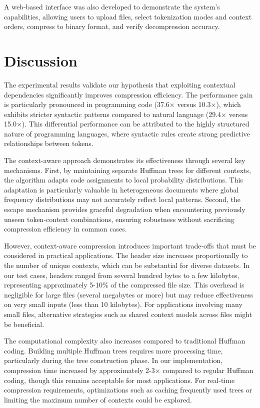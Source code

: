 \documentclass[conference]{IEEEtran}
\begin{document}
A web-based interface was also developed to demonstrate the system's capabilities, allowing users to upload files, select tokenization modes and context orders, compress to binary format, and verify decompression accuracy.

\section{Discussion}
The experimental results validate our hypothesis that exploiting contextual dependencies significantly improves compression efficiency. The performance gain is particularly pronounced in programming code (37.6× versus 10.3×), which exhibits stricter syntactic patterns compared to natural language (29.4× versus 15.0×). This differential performance can be attributed to the highly structured nature of programming languages, where syntactic rules create strong predictive relationships between tokens.

The context-aware approach demonstrates its effectiveness through several key mechanisms. First, by maintaining separate Huffman trees for different contexts, the algorithm adapts code assignments to local probability distributions. This adaptation is particularly valuable in heterogeneous documents where global frequency distributions may not accurately reflect local patterns. Second, the escape mechanism provides graceful degradation when encountering previously unseen token-context combinations, ensuring robustness without sacrificing compression efficiency in common cases.

However, context-aware compression introduces important trade-offs that must be considered in practical applications. The header size increases proportionally to the number of unique contexts, which can be substantial for diverse datasets. In our test cases, headers ranged from several hundred bytes to a few kilobytes, representing approximately 5-10\% of the compressed file size. This overhead is negligible for large files (several megabytes or more) but may reduce effectiveness on very small inputs (less than 10 kilobytes). For applications involving many small files, alternative strategies such as shared context models across files might be beneficial.

The computational complexity also increases compared to traditional Huffman coding. Building multiple Huffman trees requires more processing time, particularly during the tree construction phase. In our implementation, compression time increased by approximately 2-3× compared to regular Huffman coding, though this remains acceptable for most applications. For real-time compression requirements, optimizations such as caching frequently used trees or limiting the maximum number of contexts could be explored.
\end{document}
